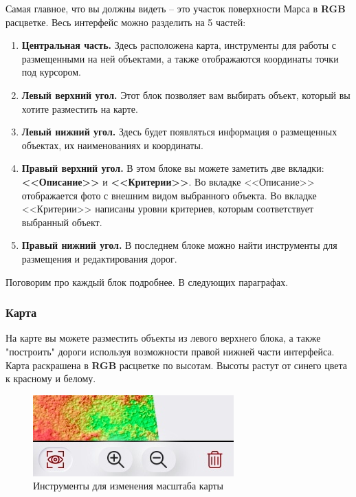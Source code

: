 Самая главное, что вы должны видеть -- это участок поверхности Марса в \textbf{RGB} расцветке. Весь интерфейс можно разделить на 5 частей:

\begin{enumerate}
	\item \textbf{Центральная часть.} Здесь расположена карта,  инструменты для работы с размещенными на ней объектами, а также отображаются координаты точки под курсором.
	\item \textbf{Левый верхний угол.} Этот блок позволяет вам выбирать объект, который вы хотите разместить на карте.
	\item \textbf{Левый нижний угол.} Здесь будет появляться информация о размещенных объектах, их наименованиях и координаты.
	\item \textbf{Правый верхний угол.} В этом блоке вы можете заметить две вкладки: \textbf{<<Описание>>} и \textbf{<<Критерии>>}. Во вкладке <<Описание>> отображается фото с внешним видом выбранного объекта. Во вкладке <<Критерии>> написаны уровни критериев, которым соответствует выбранный объект.
	\item \textbf{Правый нижний угол.} В последнем блоке можно найти инструменты для размещения и редактирования дорог.
\end{enumerate}

Поговорим про каждый блок подробнее. В следующих параграфах.

\subsubsection*{Карта}

На карте вы можете разместить объекты из левого верхнего блока, а также "построить" дороги используя возможности правой нижней части интерфейса. Карта раскрашена в \textbf{RGB} расцветке по высотам. Высоты растут от синего цвета к красному и белому.

\begin{figure}
	\centering
	\includegraphics[width=.9\linewidth]{./img/zoom}
	\caption{Инструменты для изменения масштаба карты}\label{fig:zoom}
\end{figure}

